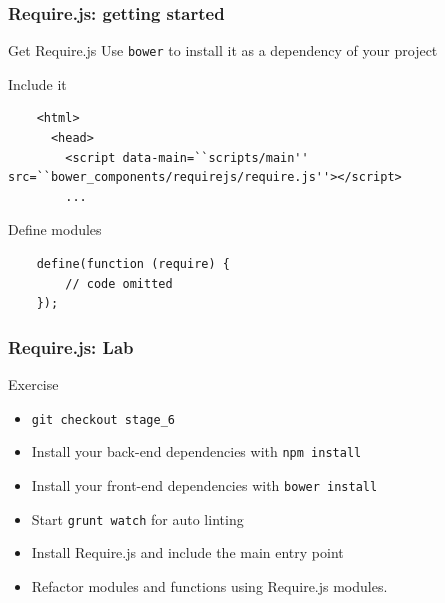 \begin{frame}[fragile]
  \frametitle{Require.js: getting started}

  \begin{block}{Get Require.js}
  Use \texttt{bower} to install it as a dependency of your project
  \end{block}

  \pause

  \begin{block}{Include it}
    {\tiny
    \begin{verbatim}
    <html>
      <head>
        <script data-main=``scripts/main'' src=``bower_components/requirejs/require.js''></script>
        ...
    \end{verbatim}
    }
  \end{block}

  \pause

  \begin{block}{Define modules}
    {\scriptsize
    \begin{verbatim}
    define(function (require) {
        // code omitted
    });
    \end{verbatim}
    }
  \end{block}
\end{frame}

\begin{frame}[fragile]
  \frametitle{Require.js: Lab}
  \begin{block}{Exercise}
    \begin{itemize}
      \item \texttt{git checkout stage\_6}
      \item Install your back-end dependencies with \texttt{npm install}
      \item Install your front-end dependencies with \texttt{bower install}
      \item Start \texttt{grunt watch} for auto linting
      \item Install Require.js and include the main entry point
      \item Refactor modules and functions using Require.js modules.
    \end{itemize}
  \end{block}
\end{frame}
